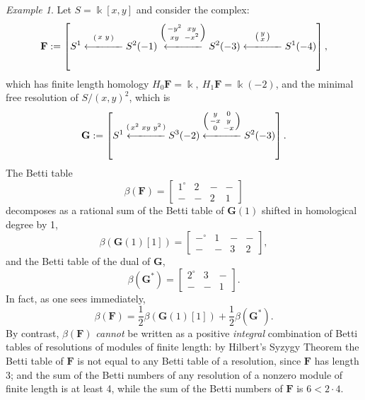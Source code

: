 \documentclass[12pt]{amsart}
\theoremstyle{definition}
\theoremstyle{remark}
\newtheorem{example}[lemma]{Example}
\newcommand{\kk}{\Bbbk}
\newcommand{\bG}{\mathbf{G}}
\newcommand{\FF}{\mathbf{F}}
\begin{document}
\begin{example}
Let $S=\kk[x,y]$ and consider the complex:
\[
\FF := \left[S^1\overset{\left(\begin{smallmatrix}x&y\end{smallmatrix}\right)}{\xlongleftarrow{\hspace*{1.1cm}}} S^2(-1)\overset{\left(\begin{smallmatrix}-y^2&xy\\xy&-x^2\end{smallmatrix}\right)}{\xlongleftarrow{\hspace*{1.1cm}}} S^2(-3)\overset{\left(\begin{smallmatrix}y\\x\end{smallmatrix}\right)}{\xlongleftarrow{\hspace*{1.1cm}}} S^1(-4)\right],
\]
which has finite length homology $H_{0}\FF = \kk,\ H_{1}\FF = \kk(-2)$, and the minimal free resolution of $S/(x,y)^{2}$, which 
is
\[
\bG := 
\left[S^1\overset{\left(\begin{smallmatrix}x^{2}&xy&y^{2}\end{smallmatrix}\right)}
{\xlongleftarrow{\hspace*{1.1cm}}} 
S^3(-2)\overset{\left(\begin{smallmatrix}y&0\\-x&y\\0&-x\end{smallmatrix}\right)}{\xlongleftarrow{\hspace*{1.1cm}}} S^2(-3)\right].
\]
The Betti table
$$
\beta(\FF)=\begin{bmatrix} 1^\circ&2&-&-\\-&-&2&1\end{bmatrix}
$$
decomposes as a rational sum of the Betti table of $\bG(1)$ shifted in 
homological degree by 1,
$$
\beta(\bG(1)[1]) =\begin{bmatrix} -^{\circ}&1&-&-\\-&-&3&2\end{bmatrix},
$$
and the Betti table of the dual of $\bG$, 
$$
\beta(\bG^{*}) = \begin{bmatrix} 2^\circ&3&-\\-&-&1\end{bmatrix}.
$$
In fact, as one sees immediately,
\[
\beta(\FF)=
\frac{1}{2}\beta(\bG(1)[1])
+
\frac{1}{2}\beta(\bG^{*}).
\]
By contrast, $\beta(\FF)$ \emph{cannot} be written as a positive \emph{integral} combination of Betti tables of resolutions of modules of finite length: by Hilbert's Syzygy Theorem the Betti table of $\FF$  is not equal to any Betti table of a resolution, since $\FF$ has length 3; and the sum of the Betti numbers of any resolution of a nonzero module of finite length is at least 4, while the sum of the Betti numbers of $\FF$ is $6<2\cdot 4$.
\end{example}
\end{document}
